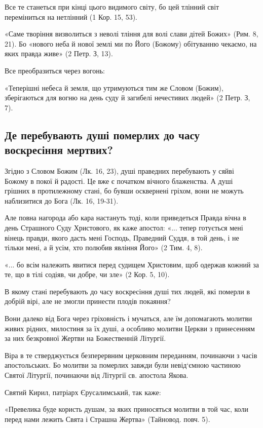 \documentclass[main.tex]{subfiles}
\begin{document}
Все те станеться при кінці цього видимого світу, бо цей тлінний світ переміниться на нетлінний (1 Кор. 15, 53).

«Саме творіння визволиться з неволі тління для волі слави дітей Божих» (Рим. 8, 21). Бо «нового неба й нової землі ми по Його (Божому) обітуванню чекаємо, на яких правда живе» (2 Петр. З, 13).

Все преобразиться через вогонь:

«Теперішні небеса й земля, що утримуються тим же Словом (Божим), зберігаються для вогню на день суду й загибелі нечестивих людей» (2 Петр. З, 7).

\subsection{Де перебувають душі померлих до часу воскресіння мертвих?}

Згідно з Словом Божим (Лк. 16, 23), душі праведних перебувають у сяйві Божому в покої й радості. Це вже є початком вічного блаженства. А душі грішних в протилежному стані, бо бувши осквернені гріхом, вони не можуть наблизитися до Бога (Лк. 16, 19-31).
 
Але повна нагорода або кара настануть тоді, коли приведеться Правда вічна в день Страшного Суду Христового, як каже апостол: «... тепер готується мені вінець правди, якого дасть мені Господь, Праведний Суддя, в той день, і не тільки мені, а й усім, хто полюбив явління Його» (2 Тим. 4, 8).

«... бо всім належить явитися перед судищем Христовим, щоб одержав кожний за те, що в тілі содіяв, чи добре, чи зле» (2 Кор. 5, 10).

В якому стані перебувають до часу воскресіння душі тих людей, які померли в добрій вірі, але не змогли принести плодів покаяння?

Вони далеко від Бога через гріховність і мучаться, але їм допомагають молитви живих рідних, милостиня за їх душі, а особливо молитви Церкви з принесенням за них безкровної Жертви на Божественній Літургії.

Віра в те стверджується безперервним церковним переданням, починаючи з часів апостольських. Бо молитви за померлих завжди були невід`ємною частиною Святої Літургії, починаючи від Літургії св. апостола Якова.

Святий Кирил, патріарх Єрусалимський, так каже:

«Превелика буде користь душам, за яких приносяться молитви в той час, коли перед нами лежить Свята і Страшна Жертва» (Тайновод. повч. 5).
\end{document}
